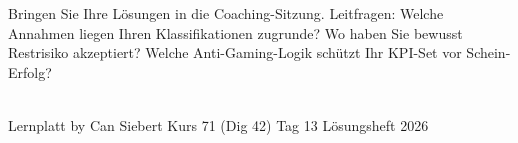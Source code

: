 \documentclass[11pt,a4paper,oneside]{article}
\begin{document}
\medskip
\begin{infobox}
Bringen Sie Ihre L\"osungen in die Coaching-Sitzung. Leitfragen: Welche Annahmen liegen Ihren Klassifikationen zugrunde? Wo haben Sie bewusst Restrisiko akzeptiert? Welche Anti-Gaming-Logik sch\"utzt Ihr KPI-Set vor Schein-Erfolg?
\end{infobox}

\vspace{1cm}
\noindent{\color{lpAccent}\rule{\linewidth}{0.6pt}}\\[4pt]
{\footnotesize\sffamily\color{lpGray}Lernplatt \textperiodcentered{} by Can Siebert \textperiodcentered{} Kurs 71 (Dig 42) \textperiodcentered{} Tag 13 \textperiodcentered{} L\"osungsheft \textperiodcentered{} \textcopyright{} 2026}
\end{document}
